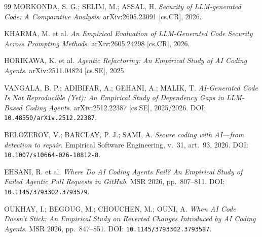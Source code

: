 \documentclass[11pt]{article}
\begin{document}
\begin{thebibliography}{99}
 MORKONDA, S. G.; SELIM, M.; ASSAL, H. \emph{Security of LLM-generated Code: A Comparative Analysis}. arXiv:2605.23091 {[cs.CR]}, 2026.

 KHARMA, M. et al. \emph{An Empirical Evaluation of LLM-Generated Code Security Across Prompting Methods}. arXiv:2605.24298 {[cs.CR]}, 2026.

 HORIKAWA, K. et al. \emph{Agentic Refactoring: An Empirical Study of AI Coding Agents}. arXiv:2511.04824 {[cs.SE]}, 2025.

 VANGALA, B. P.; ADIBIFAR, A.; GEHANI, A.; MALIK, T. \emph{AI-Generated Code Is Not Reproducible (Yet): An Empirical Study of Dependency Gaps in LLM-Based Coding Agents}. arXiv:2512.22387 {[cs.SE]}, 2025/2026. DOI: \texttt{10.48550/arXiv.2512.22387}.

 BELOZEROV, V.; BARCLAY, P. J.; SAMI, A. \emph{Secure coding with AI---from detection to repair}. Empirical Software Engineering, v.~31, art.~93, 2026. DOI: \texttt{10.1007/s10664-026-10812-8}.

 EHSANI, R. et al. \emph{Where Do AI Coding Agents Fail? An Empirical Study of Failed Agentic Pull Requests in GitHub}. MSR 2026, pp.~807--811. DOI: \texttt{10.1145/3793302.3793579}.

 OUKHAY, I.; BEGOUG, M.; CHOUCHEN, M.; OUNI, A. \emph{When AI Code Doesn't Stick: An Empirical Study on Reverted Changes Introduced by AI Coding Agents}. MSR 2026, pp.~847--851. DOI: \texttt{10.1145/3793302.3793587}.

\end{thebibliography}
\end{document}
